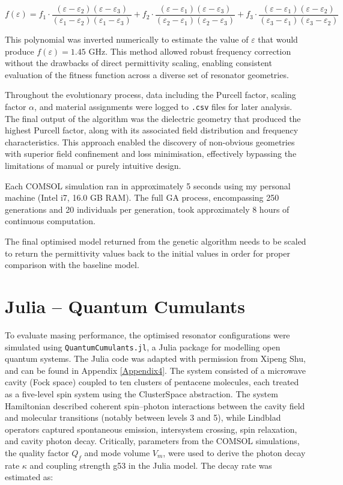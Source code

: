 \begin{equation}
  f(\varepsilon) =
    f_1 \cdot
    \frac{(\varepsilon - \varepsilon_2)(\varepsilon - \varepsilon_3)}
         {(\varepsilon_1 - \varepsilon_2)(\varepsilon_1 - \varepsilon_3)}
    + f_2 \cdot
    \frac{(\varepsilon - \varepsilon_1)(\varepsilon - \varepsilon_3)}
         {(\varepsilon_2 - \varepsilon_1)(\varepsilon_2 - \varepsilon_3)}
    + f_3 \cdot
    \frac{(\varepsilon - \varepsilon_1)(\varepsilon - \varepsilon_2)}
         {(\varepsilon_3 - \varepsilon_1)(\varepsilon_3 - \varepsilon_2)}
\end{equation}

This polynomial was inverted numerically to estimate the value of $\varepsilon$
that would produce $f(\varepsilon)=1.45$ GHz. This method allowed robust
frequency correction without the drawbacks of direct permittivity scaling,
enabling consistent evaluation of the fitness function across a diverse set of
resonator geometries.

Throughout the evolutionary process, data including the Purcell factor, scaling
factor $\alpha$, and material assignments were logged to \texttt{.csv} files for
later analysis. The final output of the algorithm was the dielectric geometry
that produced the highest Purcell factor, along with its associated field
distribution and frequency characteristics. This approach enabled the discovery
of non-obvious geometries with superior field confinement and loss minimisation,
effectively bypassing the limitations of manual or purely intuitive design.

Each COMSOL simulation ran in approximately 5 seconds using my personal machine
(Intel i7, 16.0 GB RAM). The full GA process, encompassing 250 generations and
20 individuals per generation, took approximately 8 hours of continuous
computation.

The final optimised model returned from the genetic algorithm needs to be scaled
to return the permittivity values back to the initial values in order for proper
comparison with the baseline model.

\section{Julia – Quantum Cumulants}
\label{sec:section13}
To evaluate masing performance, the optimised resonator configurations were
simulated using \texttt{QuantumCumulants.jl}, a Julia package for modelling open
quantum systems. The Julia code was adapted with permission from Xipeng Shu, and
can be found in Appendix \ref{Appendix4}. The system consisted of a microwave
cavity (Fock space) coupled to ten clusters of pentacene molecules, each treated
as a five-level spin system using the ClusterSpace abstraction. The system
Hamiltonian described coherent spin–photon interactions between the cavity field
and molecular transitions (notably between levels 3 and 5), while Lindblad
operators captured spontaneous emission, intersystem crossing, spin relaxation,
and cavity photon decay. Critically, parameters from the COMSOL simulations, the
quality factor $Q_f$ and mode volume $V_m$, were used to derive the photon decay
rate $\kappa$ and coupling strength g53 in the Julia model. The decay rate was
estimated as:

